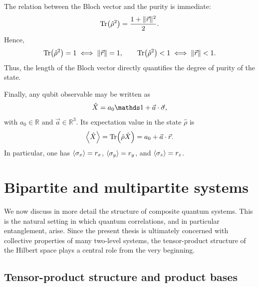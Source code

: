 The relation between the Bloch vector and the purity is immediate:
\begin{equation}
	\Tr(\hat \rho^2)=\frac{1+\|\vec r\|^2}{2}.
	\label{eq:intro_qm_purity_bloch_relation}
\end{equation}
Hence,
\begin{equation}
	\Tr(\hat \rho^2)=1
	\iff
	\|\vec r\|=1,
	\qquad
	\Tr(\hat \rho^2)<1
	\iff
	\|\vec r\|<1.
	\label{eq:intro_qm_purity_bloch_equivalence}
\end{equation}
Thus, the length of the Bloch vector directly quantifies the degree of purity of the state.

Finally, any qubit observable may be written as
\begin{equation}
	\hat X=a_0\id+\vec a\cdot\vec \sigma,
	\label{eq:intro_qm_generic_qubit_observable}
\end{equation}
with $a_0\in\mathds{R}$ and $\vec a\in\mathds{R}^3$. Its expectation value in the state $\hat \rho$ is
\begin{equation}
	\expval{\hat X}
	=
	\Tr(\hat \rho \hat X)
	=
	a_0+\vec a\cdot\vec r.
	\label{eq:intro_qm_expectation_value_qubit_observable}
\end{equation}
In particular, one has $\expval{\sigma_x}=r_x$, $\expval{\sigma_y}=r_y$, and $\expval{\sigma_z}=r_z$.


\section{Bipartite and multipartite systems}
\label{sec:bipartite_and_multipartite_systems}

We now discuss in more detail the structure of composite quantum systems. This is the natural setting in which quantum correlations, and in particular entanglement, arise. Since the present thesis is ultimately concerned with collective properties of many two-level systems, the tensor-product structure of the Hilbert space plays a central role from the very beginning.

\subsection{Tensor-product structure and product bases}


